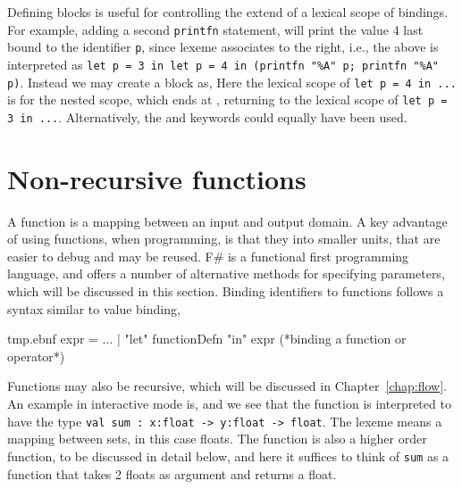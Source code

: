 Defining blocks is useful for controlling the extend of a lexical scope of bindings. For example, adding a second \lstinline!printfn! statement,
%
%
will print the value 4 last bound to the identifier \lstinline!p!, since lexeme \lexeme{;} associates to the right, i.e., the above is interpreted as \lstinline!let p = 3 in let p = 4 in (printfn "%A" p; printfn "%A" p)!. Instead we may create a block as,
%
%
Here the lexical scope of \lstinline!let p = 4 in ...! is for the nested scope, which ends at \lexeme{)}, returning to the lexical scope of \lstinline!let p = 3 in ...!. Alternatively, the  and  keywords could equally have been used.

\section{Non-recursive functions}
\label{sec:functions}
A function is a mapping between an input and output domain. A key advantage of using functions, when programming, is that they  into smaller units, that are easier to debug and may be reused. F\# is a functional first programming language, and offers a number of alternative methods for specifying parameters, which will be discussed in this section. Binding identifiers to functions follows a syntax similar to value binding,
%
\begin{verbatimwrite}{tmp.ebnf}
expr = ...
  | "let" functionDefn "in" expr (*binding a function or operator*)
\end{verbatimwrite}
%
Functions may also be recursive, which will be discussed in Chapter~\ref{chap:flow}. An example in interactive mode is,
%
%
and we see that the function is interpreted to have the type \lstinline!val sum : x:float -> y:float -> float!. The \lexeme{->} lexeme means a mapping between sets, in this case floats. The function is also a higher order function, to be discussed in detail below, and here it suffices to think of \lstinline!sum! as a function that takes 2 floats as argument and returns a float.

